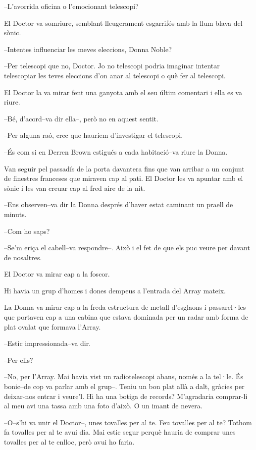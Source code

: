 --L'avorrida oficina o l'emocionant telescopi?

El Doctor va somriure, semblant lleugerament esgarrifós amb la llum
blava del sònic.

--Intentes influenciar les meves eleccions, Donna Noble?

--Per telescopi que no, Doctor. Jo no telescopi podria imaginar intentar
telescopiar les teves eleccions d'on anar al telescopi o què fer al
telescopi.

El Doctor la va mirar fent una ganyota amb el seu últim comentari i ella
es va riure.

--Bé, d'acord--va dir ella--, però no en aquest sentit.

--Per alguna raó, crec que hauríem d'investigar el telescopi.

--És com si en Derren Brown estigués a cada habitació--va riure la
Donna.

Van seguir pel passadís de la porta davantera fins que van arribar a un
conjunt de finestres franceses que miraven cap al pati. El Doctor les va
apuntar amb el sònic i les van creuar cap al fred aire de la nit.

--Ens observen--va dir la Donna després d'haver estat caminant un praell
de minuts.

--Com ho saps?

--Se'm eriça el cabell--va respondre--. Això i el fet de que els puc
veure per davant de nosaltres.

El Doctor va mirar cap a la foscor.

Hi havia un grup d'homes i dones dempeus a l'entrada del Array mateix.

La Donna va mirar cap a la freda estructura de metall d'esglaons i
passarel·les que portaven cap a una cabina que estava dominada per un
radar amb forma de plat ovalat que formava l'Array.

--Estic impressionada--va dir.

--Per ells?

--No, per l'Array. Mai havia vist un radiotelescopi abans, només a la
tel·le. És bonic--de cop va parlar amb el grup--. Teniu un bon plat allà
a dalt, gràcies per deixar-nos entrar i veure'l. Hi ha una botiga de
records? M'agradaria comprar-li al meu avi una tassa amb una foto
d'això. O un imant de nevera.

--O--s'hi va unir el Doctor--, unes tovalles per al te. Feu tovalles per
al te? Tothom fa tovalles per al te avui dia. Mai estic segur perquè
hauria de comprar unes tovalles per al te enlloc, però avui ho faria.

